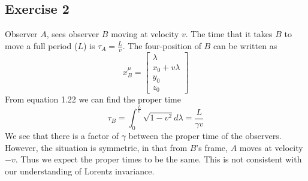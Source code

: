 \subsection{Exercise 2}
Observer $A$, sees observer $B$ moving at velocity $v$. The time that it takes $B$ to move a full period ($L$) is $\tau_A=\frac{L}{v}$. The four-position of $B$ can be written as
\begin{equation}
    x_B^\mu = \begin{bmatrix}
        \lambda \\ x_0 + v \lambda \\y_0 \\ z_0
    \end{bmatrix}
\end{equation}
From equation 1.22 we can find the proper time
\begin{equation}
    \tau_B = \int_0^\frac{L}{v} \sqrt{1-v^2}d\lambda = \frac{L}{\gamma v}
\end{equation}
We see that there is a factor of $\gamma$ between the proper time of the observers. However, the situation is symmetric, in that from $B$'s frame, $A$ moves at velocity $-v$. Thus we expect the proper times to be the same. This is not consistent with our understanding of Lorentz invariance.